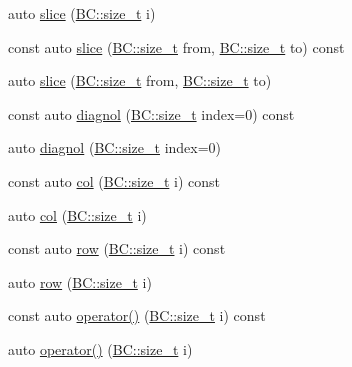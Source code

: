 \begin{DoxyCompactItemize}
\item 
auto \hyperlink{classBC_1_1tensors_1_1Tensor__Accessor_a0ebe7192afecd72c95bc3cda92acbf6c}{slice} (\hyperlink{namespaceBC_a6007cbc4eeec401a037b558910a56173}{B\+C\+::size\+\_\+t} i)
\item 
const auto \hyperlink{classBC_1_1tensors_1_1Tensor__Accessor_a0860df3634db2eb57c280380de67f4ca}{slice} (\hyperlink{namespaceBC_a6007cbc4eeec401a037b558910a56173}{B\+C\+::size\+\_\+t} from, \hyperlink{namespaceBC_a6007cbc4eeec401a037b558910a56173}{B\+C\+::size\+\_\+t} to) const 
\item 
auto \hyperlink{classBC_1_1tensors_1_1Tensor__Accessor_a4eba9a05faf98d6e80affa4bf71de0e8}{slice} (\hyperlink{namespaceBC_a6007cbc4eeec401a037b558910a56173}{B\+C\+::size\+\_\+t} from, \hyperlink{namespaceBC_a6007cbc4eeec401a037b558910a56173}{B\+C\+::size\+\_\+t} to)
\item 
const auto \hyperlink{classBC_1_1tensors_1_1Tensor__Accessor_a55a6fa7ccb5ada1fb51ea9f4572d2309}{diagnol} (\hyperlink{namespaceBC_a6007cbc4eeec401a037b558910a56173}{B\+C\+::size\+\_\+t} index=0) const 
\item 
auto \hyperlink{classBC_1_1tensors_1_1Tensor__Accessor_ab6cd9758addccce4f22d4b0af02a92ca}{diagnol} (\hyperlink{namespaceBC_a6007cbc4eeec401a037b558910a56173}{B\+C\+::size\+\_\+t} index=0)
\item 
const auto \hyperlink{classBC_1_1tensors_1_1Tensor__Accessor_ab119d40781a03a3a5a40e8fae498264e}{col} (\hyperlink{namespaceBC_a6007cbc4eeec401a037b558910a56173}{B\+C\+::size\+\_\+t} i) const 
\item 
auto \hyperlink{classBC_1_1tensors_1_1Tensor__Accessor_a27f327435604e9ec26054aa3ff23f176}{col} (\hyperlink{namespaceBC_a6007cbc4eeec401a037b558910a56173}{B\+C\+::size\+\_\+t} i)
\item 
const auto \hyperlink{classBC_1_1tensors_1_1Tensor__Accessor_a5a01f1dedb6c28667558d06ae14abb0e}{row} (\hyperlink{namespaceBC_a6007cbc4eeec401a037b558910a56173}{B\+C\+::size\+\_\+t} i) const 
\item 
auto \hyperlink{classBC_1_1tensors_1_1Tensor__Accessor_ac58b2f58424b2c9737e1599313714a3f}{row} (\hyperlink{namespaceBC_a6007cbc4eeec401a037b558910a56173}{B\+C\+::size\+\_\+t} i)
\item 
const auto \hyperlink{classBC_1_1tensors_1_1Tensor__Accessor_a151d8a544afa4efacdf2d598c79de986}{operator()} (\hyperlink{namespaceBC_a6007cbc4eeec401a037b558910a56173}{B\+C\+::size\+\_\+t} i) const 
\item 
auto \hyperlink{classBC_1_1tensors_1_1Tensor__Accessor_a489cd6c57d0993bc80c8a5e070cd9768}{operator()} (\hyperlink{namespaceBC_a6007cbc4eeec401a037b558910a56173}{B\+C\+::size\+\_\+t} i)
\end{DoxyCompactItemize}


